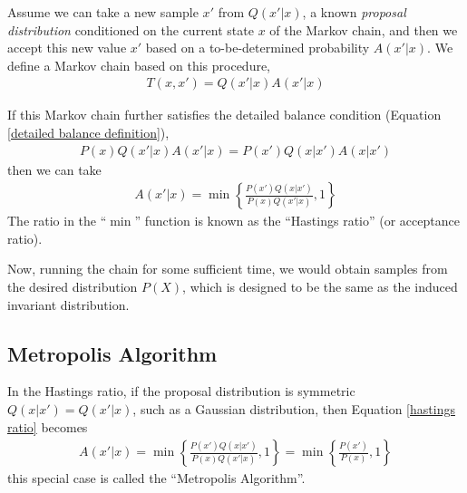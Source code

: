 \documentclass{book}
\begin{document}
Assume we can take a new sample $x'$ from $Q(x'|x)$, a known {\em{proposal distribution}} conditioned on the current state $x$ of the Markov chain, and then we accept this new value $x'$ based on a to-be-determined probability $A(x'|x)$. We define a Markov chain based on this procedure,
\begin{align}
	T(x,x') = Q(x'|x)A(x'|x)
\end{align}

If this Markov chain further satisfies the detailed balance condition (Equation \ref{detailed balance definition}),
\begin{align}
	P(x)Q(x'|x)A(x'|x) = P(x')Q(x|x')A(x|x') \label{detailed balance equation}
\end{align}
then we can take
\begin{align}
	A(x'|x) = \min \left\{ \frac{P(x')Q(x|x')}{P(x)Q(x'|x)}, 1 \right\} \label{hastings ratio}
\end{align}
The ratio in the ``$\min$'' function is known as the ``Hastings ratio'' (or acceptance ratio).

Now, running the chain for some sufficient time, we would obtain samples from the desired distribution $P(X)$, which is designed to be the same as the induced invariant distribution.


\subsection{Metropolis Algorithm}
In the Hastings ratio, if the proposal distribution is symmetric $Q(x|x') = Q(x'|x)$, such as a Gaussian distribution, then Equation \ref{hastings ratio} becomes
\begin{align}
	A(x'|x) = \min \left\{ \frac{P(x')Q(x|x')}{P(x)Q(x'|x)}, 1 \right\} = \min \left\{ \frac{P(x')}{P(x)}, 1 \right\}
\end{align}
this special case is called the ``Metropolis Algorithm''.
\end{document}
